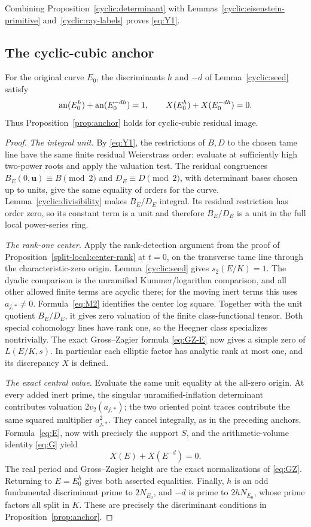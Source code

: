 Combining Proposition~\ref{cyclic:determinant} with
Lemmas~\ref{cyclic:eisenstein-primitive} and~\ref{cyclic:ray-labels} proves
\eqref{eq:Y1}.

\subsection{The cyclic-cubic anchor}

\begin{proposition}\label{cyclic:anchor}
For the original curve \(E_0\), the discriminants \(h\) and \(-d\)
of Lemma~\ref{cyclic:seed} satisfy
\[
 \operatorname{an}(E_0^h)+\operatorname{an}(E_0^{-dh})=1,\qquad
 X(E_0^h)+X(E_0^{-dh})=0.
\]
Thus Proposition~\ref{prop:anchor} holds for cyclic-cubic residual
image.
\end{proposition}

\begin{proof}
\emph{The integral unit.}  By \eqref{eq:Y1}, the restrictions of
\(B,D\) to the chosen tame line have the same finite residual
Weierstrass order: evaluate at sufficiently high two-power roots and
apply the valuation test.  The residual congruences
\(B_E(0,\mathbf u)\equiv B\pmod2\) and \(D_E\equiv D\pmod2\),
with determinant bases chosen up to units, give the same equality of
orders for the curve.  Lemma~\ref{cyclic:divisibility} makes
\(B_E/D_E\) integral.  Its residual restriction has order zero, so
its constant term is a unit and therefore \(B_E/D_E\) is a unit in
the full local power-series ring.

\emph{The rank-one center.}  Apply the rank-detection argument from the proof of
Proposition~\ref{split-local:center-rank} at \(t=0\), on the transverse tame line through the
characteristic-zero origin.  Lemma~\ref{cyclic:seed} gives
\(s_2(E/K)=1\).  The dyadic comparison is the unramified
Kummer/logarithm comparison, and all other allowed finite terms are
acyclic there; for the moving inert terms this uses
\(a_{j,*}\ne0\).  Formula~\eqref{eq:M2} identifies the center log
square. Together with the unit quotient \(B_E/D_E\), it gives zero
valuation of the finite class-functional tensor.  Both special
cohomology lines have rank one, so the Heegner class specializes
nontrivially.  The exact Gross--Zagier formula \eqref{eq:GZ-E} now
gives a simple zero of \(L(E/K,s)\).  In particular each elliptic
factor has analytic rank at most one, and its discrepancy \(X\) is
defined.

\emph{The exact central value.}  Evaluate the same unit equality at
the all-zero origin.  At every added inert prime, the singular
unramified-inflation determinant contributes valuation
\(2v_2(a_{j,*})\); the two oriented point traces contribute the
same squared multiplier \(a_{j,*}^2\).  They cancel integrally, as
in the preceding anchors.  Formula~\eqref{eq:E}, now with precisely
the support \(S\), and the arithmetic-volume identity
\eqref{eq:G} yield
\[
 X(E)+X(E^{-d})=0.
\]
The real period and Gross--Zagier height are the exact normalizations
of \eqref{eq:GZ}.  Returning to \(E=E_0^h\) gives both asserted
equalities.  Finally, \(h\) is an odd fundamental discriminant prime
to \(2N_{E_0}\), and \(-d\) is prime to \(2hN_{E_0}\), whose prime factors
all split in \(K\).  These are precisely the discriminant
conditions in Proposition~\ref{prop:anchor}.
\end{proof}

